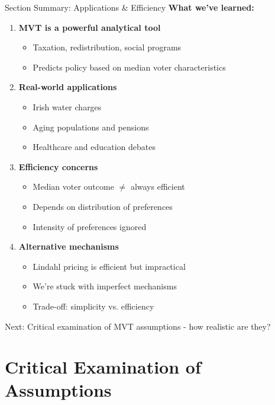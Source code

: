 \documentclass[10pt]{beamer}
\begin{document}
\begin{frame}[allowframebreaks]{Section Summary: Applications \& Efficiency}
\textbf{What we've learned:}

\begin{enumerate}
\item \textbf{MVT is a powerful analytical tool}
\begin{itemize}
\item Taxation, redistribution, social programs
\item Predicts policy based on median voter characteristics
\end{itemize}


\item \textbf{Real-world applications}
\begin{itemize}
\item Irish water charges
\item Aging populations and pensions
\item Healthcare and education debates
\end{itemize}
   \framebreak 

\item \textbf{Efficiency concerns}
\begin{itemize}
\item Median voter outcome $\neq$ always efficient
\item Depends on distribution of preferences
\item Intensity of preferences ignored
\end{itemize}


\item \textbf{Alternative mechanisms}
\begin{itemize}
\item Lindahl pricing is efficient but impractical
\item We're stuck with imperfect mechanisms
\item Trade-off: simplicity vs. efficiency
\end{itemize}
\end{enumerate}



\alert{Next:} Critical examination of MVT assumptions - how realistic are they?
\end{frame}


\section{Critical Examination of Assumptions}
\end{document}
